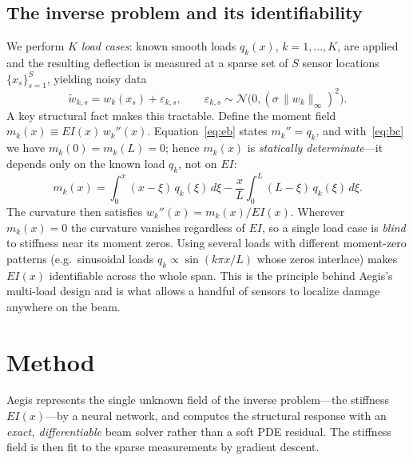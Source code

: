 \documentclass[11pt]{article}
\newcommand{\EI}{\mathit{EI}}
\newcommand{\xs}{x_{s}}
\begin{document}
\subsection{The inverse problem and its identifiability}\label{sec:identifiability}
We perform $K$ \emph{load cases}: known smooth loads $q_k(x)$, $k=1,\dots,K$, are
applied and the resulting deflection is measured at a sparse set of $S$ sensor
locations $\{\xs\}_{s=1}^{S}$, yielding noisy data
\begin{equation}
  \tilde w_{k,s} = w_k(\xs) + \varepsilon_{k,s},\qquad
  \varepsilon_{k,s}\sim\mathcal{N}\!\bigl(0,(\sigma\, \|w_k\|_\infty)^2\bigr).
  \label{eq:meas}
\end{equation}
A key structural fact makes this tractable. Define the moment field
$m_k(x)\equiv \EI(x)\,w_k''(x)$. Equation~\eqref{eq:eb} states $m_k''=q_k$, and
with~\eqref{eq:bc} we have $m_k(0)=m_k(L)=0$; hence $m_k(x)$ is
\emph{statically determinate}---it depends only on the known load $q_k$, not on
$\EI$:
\begin{equation}
  m_k(x) = \int_0^x (x-\xi)\,q_k(\xi)\,d\xi
           - \frac{x}{L}\int_0^L (L-\xi)\,q_k(\xi)\,d\xi .
  \label{eq:moment}
\end{equation}
The curvature then satisfies $w_k''(x) = m_k(x)/\EI(x)$. Wherever $m_k(x)=0$ the
curvature vanishes regardless of $\EI$, so a single load case is \emph{blind} to
stiffness near its moment zeros. Using several loads with different moment-zero
patterns (e.g.\ sinusoidal loads $q_k\propto\sin(k\pi x/L)$ whose zeros interlace)
makes $\EI(x)$ identifiable across the whole span. This is the principle behind
Aegis's multi-load design and is what allows a handful of sensors to localize
damage anywhere on the beam.

\section{Method}
Aegis represents the single unknown field of the inverse problem---the stiffness
$\EI(x)$---by a neural network, and computes the structural response with an
\emph{exact, differentiable} beam solver rather than a soft PDE residual. The
stiffness field is then fit to the sparse measurements by gradient descent.
\end{document}

